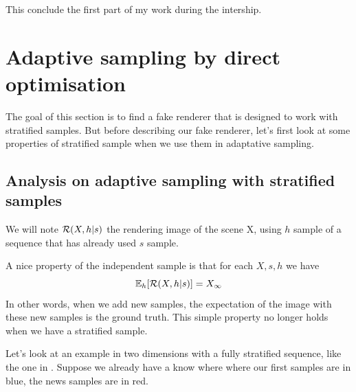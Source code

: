 \documentclass{classeENS}
\begin{document}
\par This conclude the first part of my work during the intership.


\section{Adaptive sampling by direct optimisation}

The goal of this section is to find a fake renderer that is designed to work
with stratified samples. But before describing our fake renderer, let's first look at
some properties of stratified sample when we use them in adaptative sampling.

\subsection{Analysis on adaptive sampling with stratified samples}

We will note $\mathcal R(X, h | s)$ the rendering image of the scene X, using $h$ sample of
a sequence that has already used $s$ sample.

\par A nice property of the independent sample is that for each $X,s,h$ we have
\[ \mathbb E_h[\mathcal R(X,h | s)] = X_\infty \]
In other words, when we add new samples, the expectation of the image 
with these new samples is the ground truth. This simple property no 
longer holds when we have a stratified sample.
\par Let's look at an example in two dimensions with a fully stratified 
sequence, like the one in \cite{10.2312:sr.20211287}. Suppose we already 
have a know where where our first samples are in blue, the news samples 
are in red.
\end{document}
